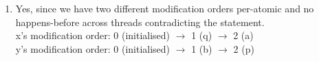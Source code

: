 \documentclass[12pt, a4paper]{article}
\begin{document}
\begin{enumerate}[Q\arabic*.]
\begin{enumerate}
      \item Yes, since we have two different modification orders per-atomic and no happens-before across threads contradicting the statement.\\
        x’s modification order: 0 (initialised) $\rightarrow$ 1 (q) $\rightarrow$ 2 (a)\\
        y’s modification order: 0 (initialised) $\rightarrow$ 1 (b) $\rightarrow$ 2 (p)

    \end{enumerate}
\end{enumerate}
\end{document}
